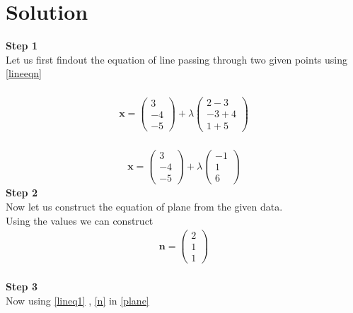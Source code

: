 \documentclass[10pt,a4paper,twocolumn]{article}
\numberwithin{equation}{section}
\begin{document}
\section{Solution}
\textbf{Step 1}\\
Let us first findout the equation of line passing through two given points using \ref{lineeqn} \\
\\\begin{gather}\textbf{x}=\begin{pmatrix}3 \\-4 \\-5\end{pmatrix}+\lambda 
\begin{pmatrix}2-3 \\-3+4 \\1+5\end{pmatrix}\end{gather}
\\
\begin{gather}\label{lineq1}
\textbf{x}=\begin{pmatrix}3 \\-4 \\-5\end{pmatrix}+\lambda 
\begin{pmatrix}-1 \\1 \\6\end{pmatrix}
\end{gather}
\textbf{Step 2}\\
Now let us construct the equation of plane from the given data.\\
Using the values we can construct 
\begin{gather}\label{n}
\textbf{n}=\begin{pmatrix} 2\\ 1\\1\end{pmatrix}
\end{gather}\\

\textbf{Step 3}\\
Now using \ref{lineq1} , \ref{n}   in \ref{plane}\\
\end{document}

